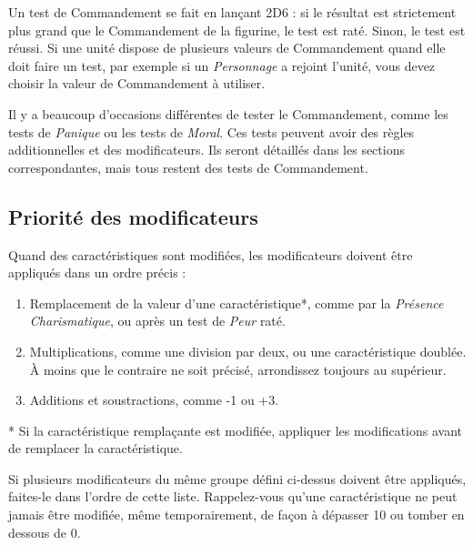 Un test de Commandement se fait en lançant 2D6 : si le résultat est strictement plus grand que le Commandement de la figurine, le test est raté. Sinon, le test est réussi. Si une unité dispose de plusieurs valeurs de Commandement quand elle doit faire un test, par exemple si un \emph{Personnage} a rejoint l'unité, vous devez choisir la valeur de Commandement à utiliser.

Il y a beaucoup d'occasions différentes de tester le Commandement, comme les tests de \emph{Panique} ou les tests de \emph{Moral}. Ces tests peuvent avoir des règles additionnelles et des modificateurs. Ils seront détaillés dans les sections correspondantes, mais tous restent des tests de Commandement.

\subsection{Priorité des modificateurs}
\label{modificateurs}

Quand des caractéristiques sont modifiées, les modificateurs doivent être appliqués dans un ordre précis :
\begin{enumerate}
\item Remplacement de la valeur d'une caractéristique*, comme par la \emph{Présence Charismatique}, ou après un test de \emph{Peur} raté.
\item Multiplications, comme une division par deux, ou une caractéristique doublée. À moins que le contraire ne soit précisé, arrondissez toujours au supérieur.
\item Additions et soustractions, comme -1 ou +3.
\end{enumerate}

* Si la caractéristique remplaçante est modifiée, appliquer les modifications avant de remplacer la caractéristique. 

Si plusieurs modificateurs du même groupe défini ci-dessus doivent être appliqués, faites-le dans l'ordre de cette liste. Rappelez-vous qu'une caractéristique ne peut jamais être modifiée, même temporairement, de façon à dépasser 10 ou tomber en dessous de 0.

